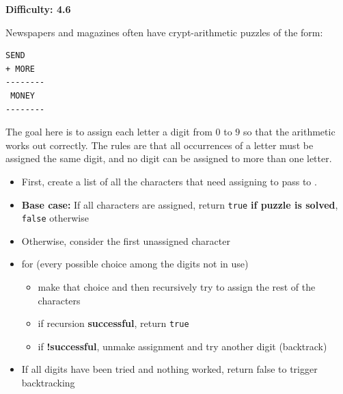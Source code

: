 \textbf{Difficulty: 4.6}

Newspapers and magazines often have crypt-arithmetic puzzles of the form:
\begin{lstlisting}[style=raygeneric]
  SEND
+ MORE
--------
 MONEY
-------- 
\end{lstlisting}
The goal here is to assign each letter a digit from $0$ to $9$ so that the
arithmetic works out correctly. The rules are that all occurrences of a
letter must be assigned the same digit, and no digit can be assigned to more
than one letter.
\begin{itemize}[noitemsep,topsep=0pt]
\item First, create a list of all the characters that need assigning to pass
  to .
\item \textbf{Base case:} If all characters are assigned, return
  \texttt{true} \textbf{if puzzle is solved}, \texttt{false} otherwise
\item Otherwise, consider the first unassigned character
\item for (every possible choice among the digits not in use)
  \begin{itemize}[noitemsep,topsep=0pt]
  \item make that choice and then recursively try to assign the rest of the
    characters
  \item if recursion \textbf{successful}, return \texttt{true}
  \item if \textbf{!successful}, unmake assignment and try another digit
    (backtrack)
  \end{itemize}
\item If all digits have been tried and nothing worked, return false to
  trigger backtracking
\end{itemize}
